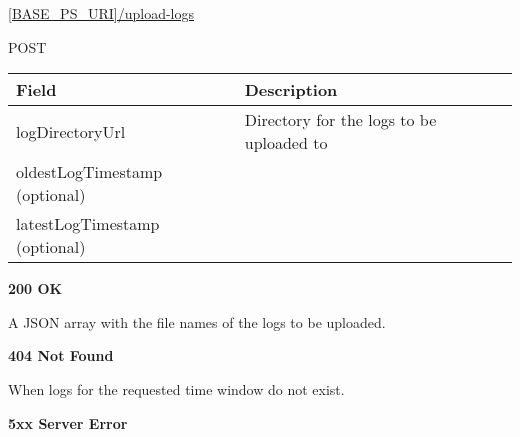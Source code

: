  \url{[BASE_PS_URI]/upload-logs}

 POST

\begin{table}[!h]
\vspace{-7mm}
\begin{tabularx}{\linewidth}{ | l | X | }
  \hline
  \rowcolor{table-head}
  Field & Description \\
  \hline
  logDirectoryUrl 		& Directory for the logs to be uploaded to \\
  oldestLogTimestamp (optional)	& \\
  latestLogTimestamp (optional)	& \\
  \hline
\end{tabularx}
\end{table}

 \textbf{200 OK}

A JSON array with the file names of the logs to be uploaded.

 \textbf{404 Not Found}

When logs for the requested time window do not exist.

\textbf{5xx Server Error}